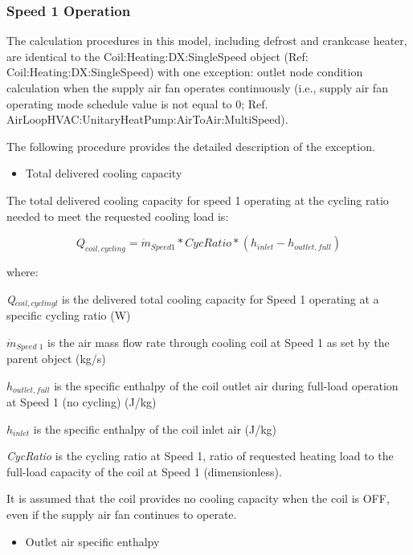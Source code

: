 \subsubsection{Speed 1 Operation}\label{speed-1-operation}

The calculation procedures in this model, including defrost and crankcase heater, are identical to the Coil:Heating:DX:SingleSpeed object (Ref: Coil:Heating:DX:SingleSpeed) with one exception: outlet node condition calculation when the supply air fan operates continuously (i.e., supply air fan operating mode schedule value is not equal to 0; Ref. AirLoopHVAC:UnitaryHeatPump:AirToAir:MultiSpeed).

The following procedure provides the detailed description of the exception.

\begin{itemize}
  \item Total delivered cooling capacity
\end{itemize}

The total delivered cooling capacity for speed 1 operating at the cycling ratio needed to meet the requested cooling load is:

\begin{equation}
{Q_{coil,cycling}} = {\dot{m}_{Speed1}}*CycRatio*({h_{inlet}} - {h_{outlet,full}})
\end{equation}

where:

\emph{Q\(_{coil,cyclingl}\)} is the delivered total cooling capacity for Speed 1 operating at a specific cycling ratio (W)

\({\dot{m}_{Speed\,\,1}}\) is the air mass flow rate through cooling coil at Speed 1 as set by the parent object (kg/s)

\(h_{outlet,full}\) is the specific enthalpy of the coil outlet air during full-load operation at Speed 1 (no cycling) (J/kg)

\(h_{inlet}\) is the specific enthalpy of the coil inlet air (J/kg)

\emph{CycRatio} is the cycling ratio at Speed 1, ratio of requested heating load to the full-load capacity of the coil at Speed 1 (dimensionless).

It is assumed that the coil provides no cooling capacity when the coil is OFF, even if the supply air fan continues to operate.

\begin{itemize}
  \item Outlet air specific enthalpy
\end{itemize}


